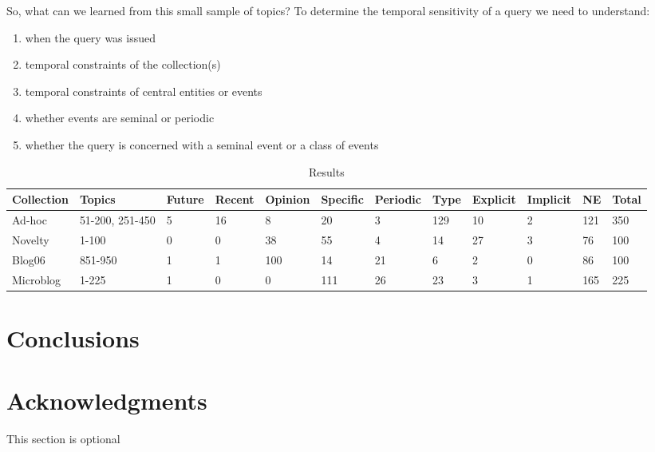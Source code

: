 \documentclass{sig-alternate}
\begin{document}
So, what can we learned from this small sample of topics?   To determine the temporal sensitivity of a query we need to understand:

\begin{enumerate}
\item when the query was issued
\item temporal constraints of the collection(s)
\item temporal constraints of central entities or events
\item whether events are seminal or periodic
\item whether the query is concerned with a seminal event or a class of events
\end{enumerate}


\begin{table}
\small
\begin{tabular}{| l | l | l | l | l | l | l | l | l | l | l | l |} \hline
\bf{Collection} & \bf{Topics}   & \bf{Future} & \bf{Recent} & \bf{Opinion} & \bf{Specific} & \bf{Periodic} & \bf{Type} & \bf{Explicit} & \bf{Implicit} & \bf{NE} & \bf{Total} \\ \hline
Ad-hoc & 51-200, 251-450 & 5 & 16 & 8 & 20 & 3 & 129 & 10 & 2 & 121 & 350 \\ \hline
Novelty & 1-100 & 0 & 0 & 38 & 55 & 4 & 14 & 27 & 3 & 76 & 100\\ \hline
Blog06 & 851-950 & 1 & 1 & 100 & 14 & 21 & 6 & 2 & 0 & 86 & 100 \\ \hline
Microblog & 1-225 & 1 & 0 & 0 & 111 & 26 & 23 & 3 & 1 & 165 & 225 \\ \hline
\end{tabular}
\caption{Results}
\label{table.results}
\end{table}


\section{Conclusions}


\section{Acknowledgments}
This section is optional

%



  
\end{document}
